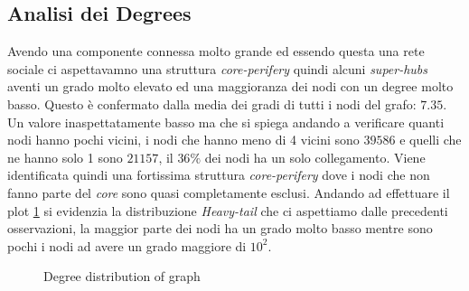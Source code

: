 \documentclass[a4paper]{article}
\begin{document}
\subsection{Analisi dei Degrees}
\label{SEC:Degree}
Avendo una componente connessa molto grande ed essendo questa una rete sociale ci aspettavamno una struttura \textit{core-perifery} quindi alcuni \textit{super-hubs} aventi un grado molto elevato ed una maggioranza dei nodi con un degree molto basso.
Questo è confermato dalla media dei gradi di tutti i nodi del grafo: $7.35$.
Un valore inaspettatamente basso ma che si spiega andando a verificare quanti nodi hanno pochi vicini, i nodi che hanno meno di 4 vicini sono $39586$ e quelli che ne hanno solo 1 sono $21157$, il $36\%$ dei nodi ha un solo collegamento.
Viene identificata quindi una fortissima struttura \textit{core-perifery} dove i nodi che non fanno parte del \textit{core} sono quasi completamente esclusi.
Andando ad effettuare il plot \ref{FIG:degree_dist_G} si evidenzia la distribuzione \textit{Heavy-tail} che ci aspettiamo dalle precedenti osservazioni, la maggior parte dei nodi ha un grado molto basso mentre sono pochi i nodi ad avere un grado maggiore di $10^2$.
\begin{figure}[!ht]
\centering
{}
\caption{Degree distribution of graph} \label{FIG:degree_dist_G}
\end{figure}
\end{document}
